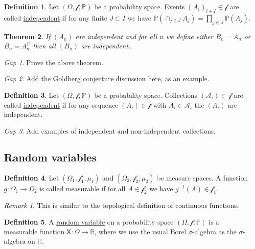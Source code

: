\documentclass[11pt]{article}
\newcommand{\col}[1]{\mathscr{#1}}
\newcommand{\rv}[1]{\mathsf{#1}}
\newcommand{\p}{\mathbb{P}}
\newcommand{\defname}[1]{\underline{#1}}
\newcommand{\RR}{\mathbb{R}}
\theoremstyle{theorem}
\newtheorem{theorem}{Theorem}[section]
\theoremstyle{definition}
\newtheorem{definition}[theorem]{Definition}
\theoremstyle{remark}
\newtheorem*{remark}{Remark}
\theoremstyle{step}
\theoremstyle{gap}
\newtheorem*{gap}{Gap}
\begin{document}
\begin{definition}
Let \((\Omega, \col{f}, \p)\) be a probability space. Events \((A_i)_{i \in I} \in \col{f}\) are called \defname{independent} if for any finite \(J \subset I\) we have \(\p\left(\cap_{j \in J} A_j\right) = \prod_{j \in J} \p\left(A_j\right)\).
\end{definition}

\begin{theorem}
If \((A_n)\) are independent and for all \(n\) we define either \(B_n = A_n\) or \(B_n = A_n^C\) then all \((B_n)\) are independent.
\end{theorem}

\begin{gap}
Prove the above theorem.
\end{gap}

\begin{gap}
Add the Goldberg conjecture discussion here, as an example.
\end{gap}

\begin{definition}
Let \((\Omega, \col{f}, \p)\) be a probability space. Collections \((\col{A}_i) \subset \col{f}\) are called \defname{independent} if for any sequence \((A_i)\in\col{f}\) with \(A_i \in \col{A}_i\) the \((A_i)\) are independent.
\end{definition}

\begin{gap}
Add examples of independent and non-independent collections.
\end{gap}


\subsection{Random variables}

\begin{definition}
Let \((\Omega_1, \col{f}_1, \mu_1)\) and \((\Omega_2, \col{f}_2, \mu_2)\) be measure spaces. A function \(g: \Omega_1 \to \Omega_2\) is called \defname{measurable} if for all \(A \in \col{f}_2\) we have \(g^{-1}(A) \in \col{f}_1\).
\end{definition}

\begin{remark}
This is similar to the topological definition of continuous functions.
\end{remark}


\begin{definition}
A \defname{random variable} on a probability space \((\Omega, \col{f}, \p)\) is a measurable function \(\rv{X}:\Omega \to \RR\), where we use the usual Borel \(\sigma\)-algebra as the \(\sigma\)-algebra on \(\RR\).
\end{definition}
\end{document}

